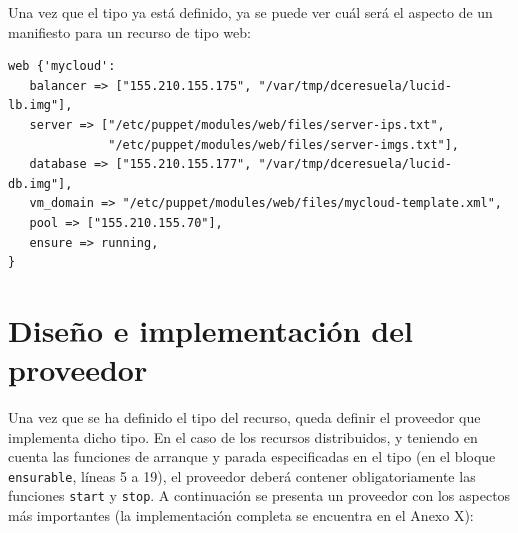 Una vez que el tipo ya está definido, ya se puede ver cuál será el aspecto de un manifiesto para un recurso de tipo web:


\begin{lstlisting}
web {'mycloud':
   balancer => ["155.210.155.175", "/var/tmp/dceresuela/lucid-lb.img"],
   server => ["/etc/puppet/modules/web/files/server-ips.txt",
              "/etc/puppet/modules/web/files/server-imgs.txt"],
   database => ["155.210.155.177", "/var/tmp/dceresuela/lucid-db.img"],
   vm_domain => "/etc/puppet/modules/web/files/mycloud-template.xml",
   pool => ["155.210.155.70"],
   ensure => running,
}
\end{lstlisting}

\section{Diseño e implementación del proveedor}

Una vez que se ha definido el tipo del recurso, queda definir el proveedor que implementa dicho tipo. En el caso de los recursos distribuidos, y teniendo en cuenta las funciones de arranque y parada especificadas en el tipo (en el bloque \texttt{ensurable}, líneas 5 a 19), el proveedor deberá contener obligatoriamente las funciones \texttt{start} y \texttt{stop}. A continuación se presenta un proveedor con los aspectos más importantes (la implementación completa se encuentra en el Anexo X):

